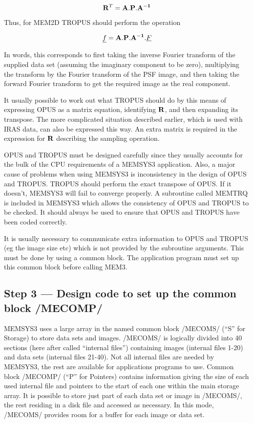 \begin {equation}
{\bf R}^{T}={\bf A}.{\bf P}.{\bf A^{-1}}
\end {equation}

Thus, for MEM2D TROPUS should perform the operation

\begin {equation}
\underline{f}={\bf A}.{\bf P}.{\bf A^{-1}}.\underline{F}
\end {equation}

In words, this corresponds to first taking the inverse Fourier transform of the
supplied data set (assuming the imaginary component to be zero), multiplying
the  transform by the Fourier transform of the PSF image, and then taking the
forward Fourier transform to get the required image as the  real component.

It usually possible to work out what TROPUS should do by this means of
expressing OPUS as a matrix equation, identifying ${\bf R}$, and then expanding
its transpose. The more complicated situation described earlier, which is  used
with IRAS data, can also be expressed this way. An extra matrix is required  in
the expression for ${\bf R}$ describing the sampling operation.

OPUS and TROPUS must be designed carefully since they usually accounts for the
bulk of the CPU requirements of a MEMSYS3 application. Also, a major cause of
problems when using MEMSYS3 is inconsistency in the design of OPUS and TROPUS.
TROPUS should perform the exact transpose of OPUS. If it
doesn't, MEMSYS3 will fail to converge properly. A subroutine called MEMTRQ is
included in MEMSYS3 which allows the consistency of OPUS and TROPUS to be
checked. It should always be used to ensure that OPUS and TROPUS have been coded
correctly.

It is usually necessary to communicate extra information to OPUS and TROPUS (eg
the image size etc) which is not provided by the subroutine arguments. This must
be done by using a common block. The application program must set up this common
block before calling MEM3.

\subsection {Step 3 --- Design code to set up the common block /MECOMP/}

MEMSYS3 uses a large array in the named common block /MECOMS/ (``S'' for
Storage) to store data sets and images. /MECOMS/ is logically divided into 40
sections (here after called ``internal files'') containing images (internal
files 1-20) and data sets (internal files 21-40). Not all internal files are
needed by MEMSYS3, the rest are available for applications programs to use.
Common block /MECOMP/ (``P'' for Pointers) contains information giving the size
of each used internal file and pointers to the start of each one within the main
storage array. It is possible to store just part of each data set or image in
/MECOMS/, the rest residing in a disk file and accessed as necessary. In this
mode, /MECOMS/ provides room for a buffer for each image or data set.

